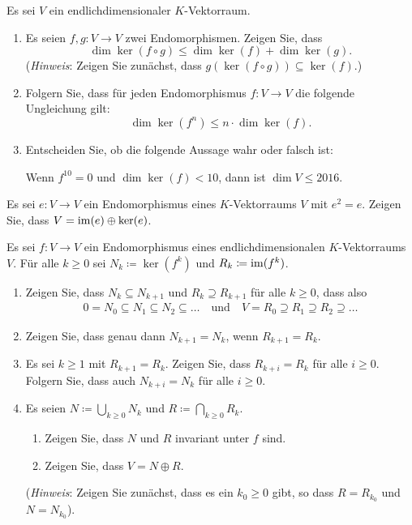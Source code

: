 \documentclass[a4paper, 10pt]{scrartcl}
\begin{document}
\begin{question}
  Es sei $V$ ein endlichdimensionaler $K$-Vektorraum.
  \begin{enumerate}[leftmargin=*]
    \item
      Es seien $f, g \colon V \to V$ zwei Endomorphismen.
      Zeigen Sie, dass
      \[
        \dim \ker(f \circ g) \leq \dim \ker(f) + \dim \ker(g).
      \]
      (\emph{Hinweis}: Zeigen Sie zunächst, dass $g(\ker(f \circ g)) \subseteq \ker(f)$.)
    \item
      Folgern Sie, dass für jeden Endomorphismus $f \colon V \to V$ die folgende Ungleichung gilt:
      \[
        \dim \ker(f^n) \leq n \cdot \dim \ker(f).
      \]
    \item
      Entscheiden Sie, ob die folgende Aussage wahr oder falsch ist:
      
      Wenn $f^{10} = 0$ und $\dim \ker(f) < 10$, dann ist $\dim V \leq 2016$.
  \end{enumerate}
\end{question}


\begin{question}
  Es sei $e \colon V \to V$ ein Endomorphismus eines $K$-Vektorraums $V$ mit $e^2 = e$.
  Zeigen Sie, dass $V = \operatorname{im}(e) \oplus \ker(e)$.
\end{question}


\begin{question}
  Es sei $f \colon V \to V$ ein Endomorphismus eines endlichdimensionalen $K$-Vektorraums $V$.
  Für alle $k \geq 0$ sei $N_k \coloneqq \ker(f^k)$ und $R_k \coloneqq \operatorname{im}(f^k)$.
  \begin{enumerate}[leftmargin=*]
    \item
      Zeigen Sie, dass $N_k \subseteq N_{k+1}$ und $R_k \supseteq R_{k+1}$ für alle $k \geq 0$, dass also
      \begin{gather*}
        0 = N_0 \subseteq N_1 \subseteq N_2 \subseteq \dotso
      \quad\text{und}\quad
        V = R_0 \supseteq R_1 \supseteq R_2 \supseteq \dotso
      \end{gather*}
    \item
      Zeigen Sie, dass genau dann $N_{k+1} = N_k$, wenn $R_{k+1} = R_k$.
    \item
      Es sei $k \geq 1$ mit $R_{k+1} = R_k$.
      Zeigen Sie, dass $R_{k+i} = R_k$ für alle $i \geq 0$.
      Folgern Sie, dass auch $N_{k+i} = N_k$ für alle $i \geq 0$.
    \item
      Es seien $N \coloneqq \bigcup_{k \geq 0} N_k$ und $R \coloneqq \bigcap_{k \geq 0} R_k$.
      \begin{enumerate}[leftmargin=*]
        \item
          Zeigen Sie, dass $N$ und $R$ invariant unter $f$ sind.
        \item
          Zeigen Sie, dass $V = N \oplus R$.
      \end{enumerate}
      (\emph{Hinweis}: Zeigen Sie zunächst, dass es ein $k_0 \geq 0$ gibt, so dass $R = R_{k_0}$ und $N = N_{k_0}$).
  \end{enumerate}
\end{question}
\end{document}
